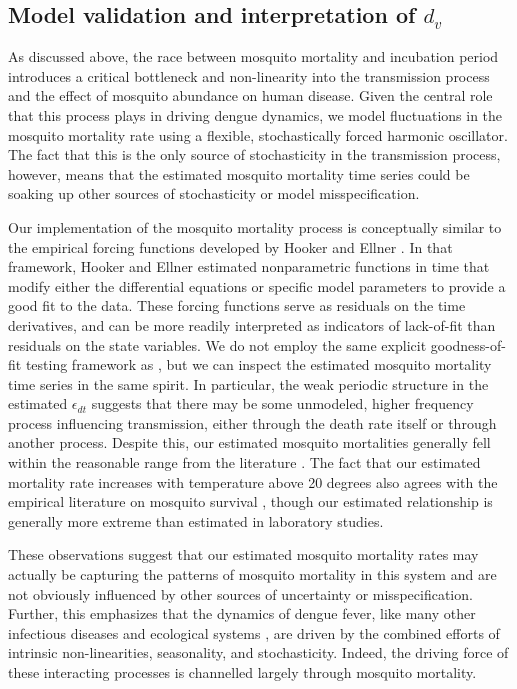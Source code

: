 \documentclass[10pt,letterpaper]{article}
\begin{document}
\subsection*{Model validation and interpretation of $d_v$}

As discussed above, the race between mosquito mortality and incubation period introduces a critical bottleneck and non-linearity into the transmission process and the effect of mosquito abundance on human disease.
Given the central role that this process plays in driving dengue dynamics, we model fluctuations in the mosquito mortality rate using a flexible, stochastically forced harmonic oscillator.
The fact that this is the only source of stochasticity in the transmission process, however,  means that the estimated mosquito mortality time series could be soaking up other sources of stochasticity or model misspecification.

Our implementation of the mosquito mortality process is conceptually similar to the empirical forcing functions developed by Hooker and Ellner \cite{Hooker2015}.
In that framework, Hooker and Ellner \cite{Hooker2015} estimated nonparametric functions in time that modify either the differential equations or specific model parameters to provide a good fit to the data.
These forcing functions serve as residuals on the time derivatives, and can be more readily interpreted as indicators of lack-of-fit than residuals on the state variables.
We do not employ the same explicit goodness-of-fit testing framework as \cite{Hooker2015}, but we can inspect the estimated mosquito mortality time series in the same spirit.
In particular, the weak periodic structure in the estimated $\epsilon_{dt}$ suggests that there may be some unmodeled, higher frequency process influencing transmission, either through the death rate itself or through another process.
Despite this, our estimated mosquito mortalities generally fell within the reasonable range from the literature \cite{Maciel-de-Freitas2008, Brady2013}.
The fact that our estimated mortality rate increases with temperature above 20 degrees also agrees with the empirical literature on mosquito survival \cite{Yang2009}, though our estimated relationship is generally more extreme than estimated in laboratory studies.

These observations suggest that our estimated mosquito mortality rates may actually be capturing the patterns of mosquito mortality in this system and are not obviously influenced by other sources of uncertainty or misspecification.
Further, this emphasizes that the dynamics of dengue fever, like many other infectious diseases \cite{Ellner1998,Koelle2004} and ecological systems \cite{Bjornstad2001}, are driven by the combined efforts of intrinsic non-linearities, seasonality, and stochasticity. 
Indeed, the driving force of these interacting processes is channelled largely through mosquito mortality.
\end{document}
